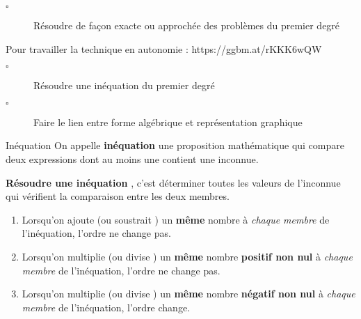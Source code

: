\documentclass[openany]{book}
\begin{document}
\begin{seance}

\begin{description}
\item[$\square$] Résoudre de façon exacte ou approchée des problèmes du premier degré
\end{description}
\end{seance}

\Exe



\Exe




\Exe




\Exe



\Exe

Pour travailler la technique en autonomie : https://ggbm.at/rKKK6wQW


\begin{seance}

\begin{description}
\item[$\square$] Résoudre une inéquation du premier degré
\item[$\square$] Faire le lien entre forme algébrique et représentation graphique
\end{description}
\end{seance}

\Exe



\begin{DefT}{Inéquation}
On appelle \textbf{inéquation} une proposition mathématique qui compare deux expressions dont au moins une contient une inconnue. 

\textbf{Résoudre une inéquation} , c'est déterminer toutes les valeurs de l'inconnue qui vérifient la comparaison entre les deux membres.
\end{DefT}

\begin{Reg}
\begin{enumerate}
\item Lorsqu'on ajoute (ou soustrait ) un \textbf{même} nombre à \textit{chaque membre} de l'inéquation, l'ordre ne change pas.
\item Lorsqu'on multiplie (ou divise ) un \textbf{même} nombre \textbf{positif non nul} à \textit{chaque membre} de l'inéquation, l'ordre ne change pas.
\item {} Lorsqu'on multiplie (ou divise ) un \textbf{même} nombre \textbf{négatif non nul} à \textit{chaque membre} de l'inéquation, l'ordre change.
\end{enumerate}
\end{Reg}
\end{document}
